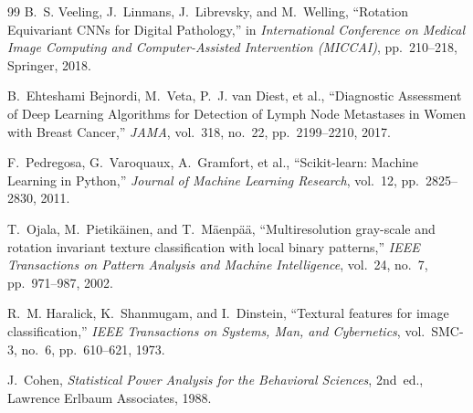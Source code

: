 \documentclass[11pt,a4paper]{article}
\begin{document}
\begin{thebibliography}{99}
B.~S. Veeling, J.~Linmans, J.~Librevsky, and M.~Welling, ``Rotation Equivariant CNNs for Digital Pathology,'' in \textit{International Conference on Medical Image Computing and Computer-Assisted Intervention (MICCAI)}, pp.~210--218, Springer, 2018.

B.~Ehteshami Bejnordi, M.~Veta, P.~J. van Diest, et al., ``Diagnostic Assessment of Deep Learning Algorithms for Detection of Lymph Node Metastases in Women with Breast Cancer,'' \textit{JAMA}, vol.~318, no.~22, pp.~2199--2210, 2017.

F.~Pedregosa, G.~Varoquaux, A.~Gramfort, et al., ``Scikit-learn: Machine Learning in Python,'' \textit{Journal of Machine Learning Research}, vol.~12, pp.~2825--2830, 2011.

T.~Ojala, M.~Pietik{\"a}inen, and T.~M{\"a}enp{\"a}{\"a}, ``Multiresolution gray-scale and rotation invariant texture classification with local binary patterns,'' \textit{IEEE Transactions on Pattern Analysis and Machine Intelligence}, vol.~24, no.~7, pp.~971--987, 2002.

R.~M. Haralick, K.~Shanmugam, and I.~Dinstein, ``Textural features for image classification,'' \textit{IEEE Transactions on Systems, Man, and Cybernetics}, vol.~SMC-3, no.~6, pp.~610--621, 1973.

J.~Cohen, \textit{Statistical Power Analysis for the Behavioral Sciences}, 2nd~ed., Lawrence Erlbaum Associates, 1988.
\end{thebibliography}
\end{document}
